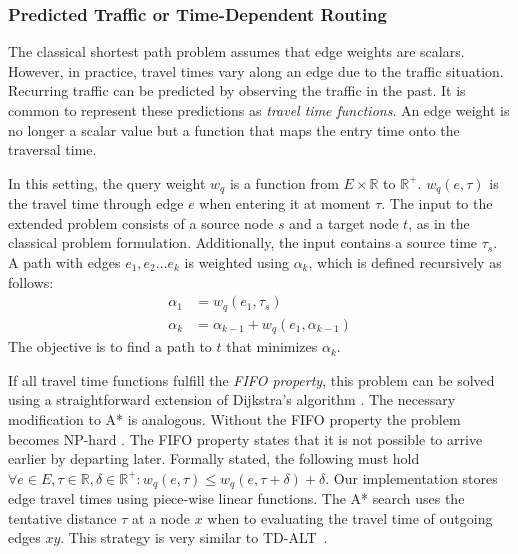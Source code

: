 \documentclass[manuscript,review]{acmart}
\begin{document}
\subsubsection{Predicted Traffic or Time-Dependent Routing}
\label{sec:predicted-traffic}

The classical shortest path problem assumes that edge weights are scalars.
However, in practice, travel times vary along an edge due to the traffic situation.
Recurring traffic can be predicted by observing the traffic in the past.
It is common \cite{bgsv-mtdtt-13,bdpw-dtdrp-16,swz-sfert-20} to represent these predictions as \emph{travel time functions}.
An edge weight is no longer a scalar value but a function that maps the entry time onto the traversal time.

In this setting, the query weight $w_q$ is a function from $E\times \mathbb{R}$ to $\mathbb{R}^+$.
$w_q(e, \tau)$ is the travel time through edge $e$ when entering it at moment $\tau$.
The input to the extended problem consists of a source node $s$ and a target node $t$, as in the classical problem formulation.
Additionally, the input contains a source time $\tau_s$.
A path with edges $e_1,e_2\ldots e_k$ is weighted using $\alpha_k$, which is defined recursively as follows:\[
\begin{split}
\alpha_{1} & = w_q(e_1, \tau_s) \\
\alpha_{k} & = \alpha_{k-1} + w_q(e_1, \alpha_{k-1})
\end{split}
\]
The objective is to find a path to $t$ that minimizes $\alpha_k$.

If all travel time functions fulfill the \emph{FIFO property}, this problem can be solved using a straightforward extension of Dijkstra's algorithm \cite{d-aassp-69}.
The necessary modification to A* is analogous.
Without the FIFO property the problem becomes NP-hard \cite{or-tnp-89}.
The FIFO property states that it is not possible to arrive earlier by departing later.
Formally stated, the following must hold $\forall e\in E,\tau\in \mathbb{R},\delta\in \mathbb{R}^+: w_q(e, \tau) \le w_q(e, \tau+\delta) + \delta$.
Our implementation stores edge travel times using piece-wise linear functions.
The A* search uses the tentative distance $\tau$ at a node $x$ when to evaluating the travel time of outgoing edges $x y$.
This strategy is very similar to TD-ALT~\cite{ndls-bastd-12,dw-lbrdg-07}.
\end{document}
